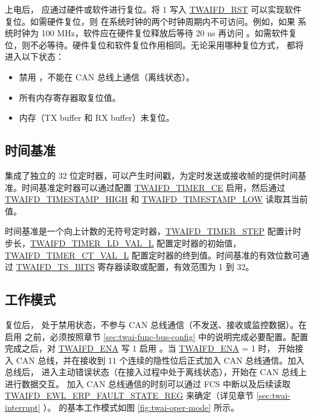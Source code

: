 \documentclass[main\_\_CN.tex]{subfiles}
\begin{document}
上电后，\modulename{} 应通过硬件或软件进行复位。将 1 写入 \hyperref[fielddesc:TWAIFDRST]{TWAIFD\_RST} 可以实现软件复位。如需硬件复位，则 \modulename{} 在系统时钟的两个时钟周期内不可访问。例如，如果 \modulename{} 系统时钟为 100 MHz，软件应在硬件复位释放后等待 20 ns 再访问 \modulename{}。如需软件复位，则不必等待。硬件复位和软件复位作用相同。无论采用哪种复位方式，\modulename{} 都将进入以下状态：

\begin{itemize}
    \item 禁用 \modulename{}，不能在 CAN 总线上通信（离线状态）。
    \item \modulename{} 所有内存寄存器取复位值。
    \item \modulename{} 内存（TX buffer 和 RX buffer）未复位。
\end{itemize}




\subsection{时间基准}
\label{sec:twai-func-time-base}



\modulename{} 集成了独立的 32 位定时器，可以产生时间戳，为定时发送或接收帧的提供时间基准。时间基准定时器可以通过配置 \hyperref[fielddesc:TWAIFDTIMERCE]{TWAIFD\_TIMER\_CE} 启用，然后通过 \hyperref[fielddesc:TWAIFDTIMESTAMPHIGH]{TWAIFD\_TIMESTAMP\_HIGH} 和 \hyperref[fielddesc:TWAIFDTIMESTAMPLOW]{TWAIFD\_TIMESTAMP\_LOW} 读取其当前值。

时间基准是一个向上计数的无符号定时器，\hyperref[fielddesc:TWAIFDTIMERSTEP]{TWAIFD\_TIMER\_STEP} 配置计时步长，\hyperref[fielddesc:TWAIFDTIMERLDVALL]{TWAIFD\_TIMER\_LD\_VAL\_L} 配置定时器的初始值，\hyperref[regdesc:TWAIFDTIMERCTVALLREG]{TWAIFD\_TIMER\_CT\_VAL\_L} 配置定时器的终到值。时间基准的有效位数可通过 \hyperref[fielddesc:TWAIFDTSBITS]{TWAIFD\_TS\_BITS} 寄存器读取或配置，有效范围为 1 到 32。

\subsection{工作模式}
\label{sec:twai-func-oper-mode}

复位后，\modulename{} 处于禁用状态，不参与 CAN 总线通信（不发送、接收或监控数据）。在启用 \modulename{} 之前，必须按照章节 \ref{sec:twai-func-bus-config} \textit{} 中的说明完成必要配置。配置完成之后，对 \hyperref[fielddesc:TWAIFDENA]{TWAIFD\_ENA} 写 1 启用 \modulename{}。当 \hyperref[fielddesc:TWAIFDENA]{TWAIFD\_ENA} = 1 时，\modulename{} 开始接入 CAN 总线，并在接收到 11 个连续的隐性位后正式加入 CAN 总线通信。加入总线后，\modulename{} 进入主动错误状态（在接入过程中处于离线状态），开始在 CAN 总线上进行数据交互。\modulename{} 加入 CAN 总线通信的时刻可以通过 FCS 中断以及后续读取 \hyperref[regdesc:TWAIFDEWLERPFAULTSTATEREG]{TWAIFD\_EWL\_ERP\_FAULT\_STATE\_REG} 来确定（详见章节 \ref{sec:twai-interrupt} \textit{}）。\modulename{} 的基本工作模式如图 \ref{fig:twai-oper-mode} 所示。
\end{document}
